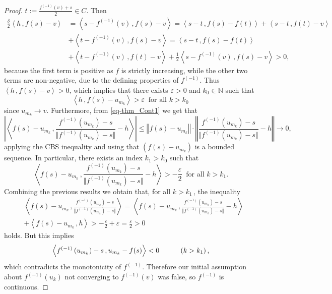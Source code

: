 \documentclass[12pt]{amsart}
\theoremstyle{remark}
\theoremstyle{definition}
\newcommand{\NN}{\mathbb{N}}
\newcommand{\nma}{\Vert}
\newcommand{\bsz}[2]{\left \langle #1 \,, #2 \right \rangle}
\begin{document}
\begin{proof}
$ t := \frac{f^{(-1)}(v) + s}{2} \in C $. Then 
\begin{align*}
\frac{\delta}{2} \bsz{h}{f(s)-v} & = 
\bsz{s - f^{(-1)}(v)}{f(s)-v} = 
\bsz{s-t}{f(s)-f(t)} + \bsz{s-t}{f(t)-v} \\ 
& + \bsz{t-f^{(-1)}(v)}{f(s)-v} = 
\bsz{s-t}{f(s)-f(t)} \\ 
& + \bsz{t - f^{(-1)}(v)}{f(t)-v} + 
\frac{1}{2} \bsz{s - f^{(-1)}(v)}{f(s)-v} > 0, 
\end{align*} 
because the first term is positive as $ f $ is strictly 
increasing, while the other two terms are 
non-negative, due to the defining properties of 
$ f^{(-1)} $. Thus 
$ \bsz{h}{f(s)-v} > 0 $, which implies that there 
exists $ \varepsilon > 0 $ and $ k_0 \in \NN $ such that 
\[
\bsz{h}{f(s)-u_{m_k}} > \varepsilon 
\ \mbox{ for all } k > k_0 \, 
\]
since $ u_{m_k} \to v $. 
Furthermore, from \eqref{eq-thm_Cont1} we get that  
\[ 
\left \vert 
\bsz	{f(s) - u_{m_k}}{\frac{ f^{(-1)}\left( u_{m_k} \right) - s}{
\nma f^{(-1)}\left( u_{m_k} \right) - s \nma} - h} 
\right \vert 
\leq 
\left \nma f(s) - u_{m_k} \right \nma \cdot 
\left \nma \frac{ f^{(-1)}\left( u_{m_k} \right) - s}{
\nma f^{(-1)}\left( u_{m_k} \right) - s \nma} - h \right \nma 
\to 0, 
\]
applying the CBS inequality and 
using that $ \left( f(s) - u_{m_k} \right) $ 
is a bounded sequence. 
In particular, there exists an index $ k_1 > k_0 $ 
such that 
\[
\bsz	{f(s) - u_{m_k}}{\frac{ f^{(-1)}\left( u_{m_k} \right) - s}{
\nma f^{(-1)}\left( u_{m_k} \right) - s \nma} - h} 
> - \frac{\varepsilon}{2} 
\ \mbox{ for all } k > k_1. 
\]
Combining the previous results we obtain that, 
for all $ k > k_1 \,$, the inequality 
\begin{align*}
& \bsz{f(s)-u_{m_k}}{\frac{ f^{(-1)}\left( u_{m_k} \right) - s}{
\nma f^{(-1)}\left( u_{m_k} \right) - s \nma}} 
= 
\bsz{f(s)-u_{m_k}}{\frac{ f^{(-1)}\left( u_{m_k} \right) - s}{
\nma f^{(-1)}\left( u_{m_k} \right) - s \nma}-h} \\ 
& + \bsz{f(s)-u_{m_k}}{h} > - \frac{\varepsilon}{2} 
+ \varepsilon = \frac{\varepsilon}{2} > 0 
\end{align*} 
holds. 
But this implies 
\[
\bsz{f^{(-1)}\left( u_{m_k} \right) - s}{u_{m_k} - f(s)} 
< 0 
\hspace{10mm} \left( k > k_1 \right), 
\]
which contradicts the monotonicity of $ f^{(-1)} $. 
Therefore our initial assumption about 
$ f^{(-1)}(u_k) $ not converging to $ f^{(-1)}(v) $ 
was false, so $ f^{(-1)} $ is continuous. 
\end{proof}
\end{document}
